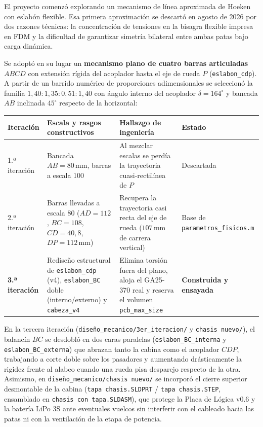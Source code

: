 \documentclass[11pt,a4paper]{report}
\newcommand{\ud}[1]{\,\mathrm{#1}}
\begin{document}
El proyecto comenzó explorando un mecanismo de línea aproximada de Hoeken con eslabón
flexible. Esa primera aproximación se descartó en agosto de 2026 por dos razones técnicas:
la concentración de tensiones en la bisagra flexible impresa en FDM y la dificultad de
garantizar simetría bilateral entre ambas patas bajo carga dinámica.

Se adoptó en su lugar un \textbf{mecanismo plano de cuatro barras articuladas} $ABCD$ con
extensión rígida del acoplador hasta el eje de rueda $P$ (\texttt{eslabon\_cdp}). A partir de un
barrido numérico de proporciones adimensionales se seleccionó la familia
$1{,}40 : 1{,}35 : 0{,}51 : 1{,}40$ con ángulo interno del acoplador $\delta = 164^\circ$ y
bancada $AB$ inclinada $45^\circ$ respecto de la horizontal:

\begin{center}
\begin{tabular}{@{}llll@{}}
\toprule
\textbf{Iteración} & \textbf{Escala y rasgos constructivos} & \textbf{Hallazgo de ingeniería} & \textbf{Estado} \\
\midrule
1.ª iteración & Bancada $AB = 80\ud{mm}$, barras a escala 100 & Al mezclar escalas se perdía la trayectoria cuasi-rectilínea de $P$ & Descartada \\
2.ª iteración & Barras llevadas a escala 80 ($AD=112$, $BC=108$, $CD=40{,}8$, $DP=112\ud{mm}$) & Recupera la trayectoria casi recta del eje de rueda ($107\ud{mm}$ de carrera vertical) & Base de \texttt{parametros\_fisicos.m} \\
\textbf{3.ª iteración} & Rediseño estructural de \texttt{eslabon\_cdp} (v4), \texttt{eslabon\_BC} doble (interno/externo) y \texttt{cabeza\_v4} & Elimina torsión fuera del plano, aloja el GA25-370 real y reserva el volumen \texttt{pcb\_max\_size} & \textbf{Construida y ensayada} \\
\bottomrule
\end{tabular}
\end{center}

En la tercera iteración (\texttt{diseño\_mecanico/3er\_iteracion/} y \texttt{chasis nuevo/}), el
balancín $BC$ se desdobló en dos caras paralelas (\texttt{eslabon\_BC\_interna} y
\texttt{eslabon\_BC\_externa}) que abrazan tanto la cabina como el acoplador $CDP$, trabajando a
corte doble sobre los pasadores y aumentando drásticamente la rigidez frente al alabeo cuando
una rueda pisa desparejo respecto de la otra. Asimismo, en \texttt{diseño\_mecanico/chasis nuevo/}
se incorporó el cierre superior desmontable de la cabina (\texttt{tapa chasis.SLDPRT} /
\texttt{tapa chasis.STEP}, ensamblado en \texttt{chasis con tapa.SLDASM}), que protege la
Placa de Lógica v0.6 y la batería LiPo 3S ante eventuales vuelcos sin interferir con el
cableado hacia las patas ni con la ventilación de la etapa de potencia.
\end{document}
